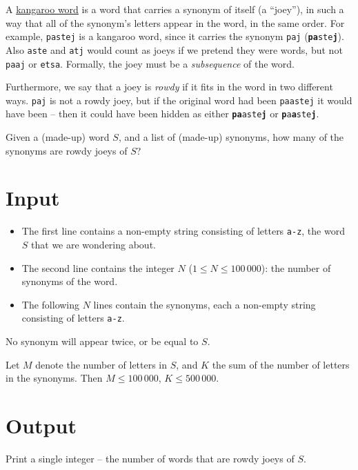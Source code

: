 
A \href{https://en.wikipedia.org/wiki/Kangaroo_word}{kangaroo word} is a word that carries a synonym of itself (a ``joey''), in such a way that all of the synonym's letters appear in the word, in the same order.
For example, \texttt{pastej} is a kangaroo word, since it carries the synonym \texttt{paj} (\texttt{\textbf{pa}ste\textbf{j}}).
Also \texttt{aste} and \texttt{atj} would count as joeys if we pretend they were words, but not \texttt{paaj} or \texttt{etsa}.
Formally, the joey must be a \emph{subsequence} of the word.

Furthermore, we say that a joey is \emph{rowdy} if it fits in the word in two different ways.
\texttt{paj} is not a rowdy joey, but if the original word had been \texttt{paastej} it would have been --
then it could have been hidden as either \texttt{\textbf{pa}aste\textbf{j}} or \texttt{\textbf{p}a\textbf{a}ste\textbf{j}}.

Given a (made-up) word $S$, and a list of (made-up) synonyms, how many of the synonyms are rowdy joeys of $S$?

\section*{Input}
\begin{itemize}
  \item
    The first line contains a non-empty string consisting of letters \texttt{a-z}, the word $S$ that we are wondering about.

  \item
    The second line contains the integer $N$ ($1 \le N \le 100\,000$): the number of synonyms of the word.

  \item
    The following $N$ lines contain the synonyms, each a non-empty string consisting of letters \texttt{a-z}.
\end{itemize}

No synonym will appear twice, or be equal to $S$.

Let $M$ denote the number of letters in $S$, and $K$ the sum of the number of letters in the synonyms.
Then $M \le 100\,000$, $K \le 500\,000$.

\section*{Output}
Print a single integer -- the number of words that are rowdy joeys of $S$.

